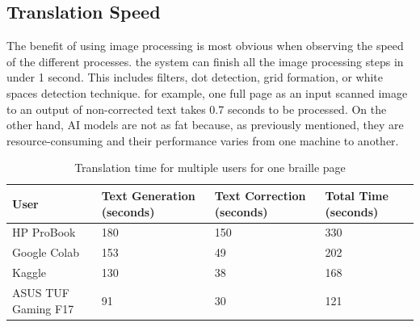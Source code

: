 \subsection{Translation Speed}
The benefit of using image processing is most obvious when observing the speed of the different processes.  the system can finish all the image processing steps in under 1 second.  This includes filters, dot detection, grid formation, or white spaces detection  technique.  for example, one full page as an input scanned image to an output of non-corrected text takes 0.7 seconds to be processed.
On the other hand, AI models are not as fat because, as previously mentioned, they are resource-consuming and their performance varies from one machine to another.

\begin{table}[h!]
    \centering 
    \begin{tabular}{|l|p{3cm}|p{3cm}|p{3cm}|}
        \hline
        \textbf{User} & \textbf{Text Generation (seconds)} & \textbf{Text Correction (seconds)} & \textbf{Total Time (seconds)} \\
        \hline
        HP ProBook & 180 & 150 & 330 \\
        \hline
        Google Colab & 153 & 49 & 202 \\
        \hline
        Kaggle & 130 & 38 & 168 \\
        \hline
        ASUS TUF Gaming F17 & 91 & 30 & 121 \\
        \hline
    \end{tabular}
    \caption{Translation time for multiple users for one braille page}
    \label{tab:translation-times}
\end{table}